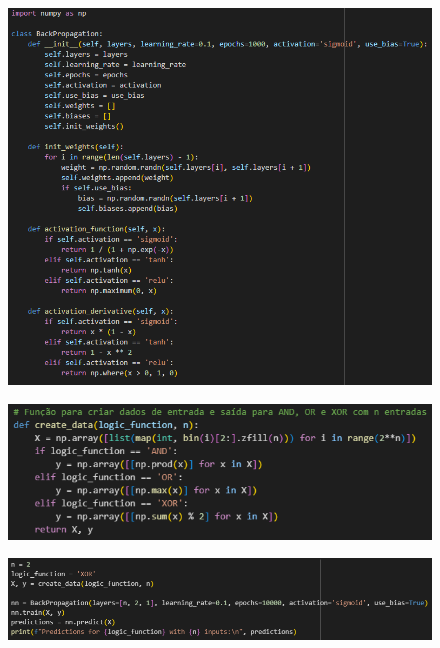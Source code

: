 \documentclass[12pt]{article}
\begin{document}
\begin{figure}[h]
	\centering
	\includegraphics[width=.8\textwidth]{image7.png}
\end{figure}

\begin{figure}[h]
	\centering
	\includegraphics[width=.8\textwidth]{image8.png}
\end{figure}

\begin{figure}[h]
	\centering
	\includegraphics[width=.8\textwidth]{image9.png}
\end{figure}
\end{document}
